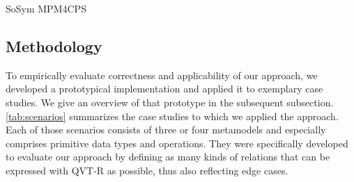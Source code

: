 \begin{copiedFrom}{SoSym MPM4CPS}

\subsection{Methodology}
\label{sec:evaluation:methodology}

To empirically evaluate correctness and applicability of our approach, we developed a prototypical implementation and applied it to exemplary case studies.
We give an overview of that prototype in the subsequent subsection.
\autoref{tab:scenarios} summarizes the case studies to which we applied the approach.
Each of those scenarios consists of three or four metamodels and especially comprises primitive data types and operations.
They were specifically developed to evaluate our approach by defining as many kinds of relations that can be expressed with QVT-R as possible, thus also reflecting edge cases.


\end{copiedFrom}
